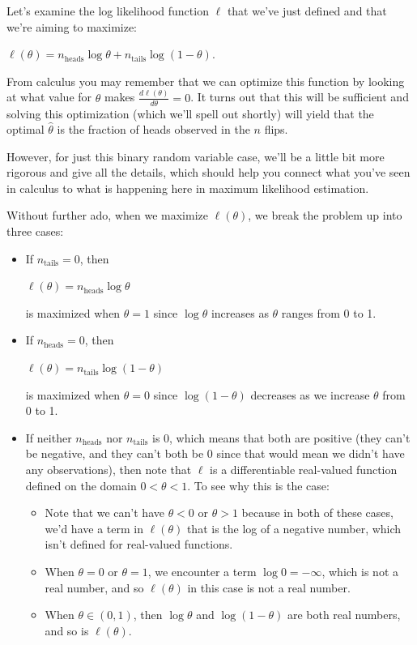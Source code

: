 \documentclass[6008notes.tex]{subfiles}
\begin{document}
Let's examine the log likelihood function $\ell$ that we've just defined and that we're aiming to maximize:

{\centering$\ell (\theta )=n_{\text {heads}}\log \theta +n_{\text {tails}}\log (1-\theta ).$ \par}
 
From calculus you may remember that we can optimize this function by looking at what value for $\theta$ makes $\frac{d\ell (\theta )}{d\theta }=0$. It turns out that this will be sufficient and solving this optimization (which we'll spell out shortly) will yield that the optimal $\widehat{\theta }$ is the fraction of heads observed in the $n$ flips.

However, for just this binary random variable case, we'll be a little bit more rigorous and give all the details, which should help you connect what you've seen in calculus to what is happening here in maximum likelihood estimation.

Without further ado, when we maximize $\ell (\theta )$, we break the problem up into three cases:

\begin{itemize}
\item If $n_{\text {tails}}=0$, then

{\centering$\ell (\theta )=n_{\text {heads}}\log \theta$ \par}
 
is maximized when $\theta=1$ since $\log \theta$ increases as $\theta$ ranges from 0 to 1.

\item If $n_{\text {heads}}=0$, then

{\centering$\ell (\theta )=n_{\text {tails}}\log (1-\theta )$ \par}
 
is maximized when $\theta=0$ since $\log (1-\theta )$ decreases as we increase $\theta$ from 0 to 1.

\item If neither $n_{\text {heads}}$ nor $n_{\text {tails}}$ is 0, which means that both are positive (they can't be negative, and they can't both be 0 since that would mean we didn't have any observations), then note that $\ell$ is a differentiable real-valued function defined on the domain $0< \theta <1$. To see why this is the case:

\begin{itemize}
\item Note that we can't have $\theta<0$ or $\theta>1$ because in both of these cases, we'd have a term in $\ell (\theta )$ that is the log of a negative number, which isn't defined for real-valued functions.

\item When $\theta=0$ or $\theta=1$, we encounter a term $\log 0=-\infty$, which is not a real number, and so $\ell (\theta )$ in this case is not a real number.

\item When $\theta \in (0,1)$, then $\log \theta$ and $\log (1-\theta )$ are both real numbers, and so is $\ell (\theta )$.
\end{itemize}
\end{itemize}
\end{document}
